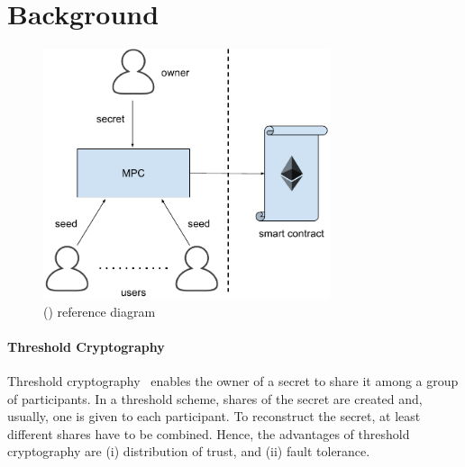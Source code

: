 \vspace*{-2pt}
\section{Background}\label{sect:background}

\begin{figure}[tp]
	\centering
	\includegraphics[width=0.75\textwidth]{fig/proposal}
	\vspace*{11pt}
	\caption{\name (\shortname) reference diagram}
	\label{fig:model}
\end{figure}




\paragraph*{Threshold Cryptography}

Threshold cryptography~\cite{Shamir:1979:SS:359168.359176} enables the owner of a secret to share it among a group of participants. 
In a \KofN threshold scheme, \N shares of the secret are created and, usually, one is given to each participant. 
To reconstruct the secret, at least \K different shares have to be combined.
Hence, the advantages of threshold cryptography are (i) distribution of trust,
and (ii) fault tolerance.

\smallskip


